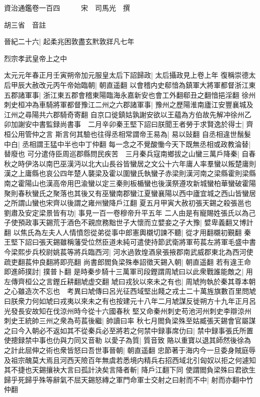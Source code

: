 資治通鑑卷一百四　　　宋　司馬光　撰

胡三省　音註

晉紀二十六|{
	起柔兆困敦盡玄黓敦牂凡七年}


烈宗孝武皇帝上之中

太元元年春正月壬寅朔帝加元服皇太后下詔歸政|{
	太后攝政見上卷上年}
復稱崇德太后甲辰大赦改元丙午帝始臨朝|{
	朝直遥翻}
以會稽内史郗愔為鎮軍大將軍都督浙江東五郡諸軍事|{
	浙江東五郡會稽東陽臨海永嘉新安也會工外翻郗丑之翻愔挹淫翻}
徐州刺史桓冲為車騎將軍都督豫江二州之六郡諸軍事|{
	豫州之歷陽淮南廬江安豐襄城及江州之尋陽共六郡騎奇寄翻}
自京口徙鎮姑孰謝安欲以王藴為方伯故先解冲徐州乙卯加謝安中書監録尚書事　二月辛卯秦王堅下詔曰朕聞王者勞于求賢逸於得士|{
	齊桓公用管仲之言}
斯言何其驗也往得丞相常謂帝王易為|{
	易以䜴翻}
自丞相違世鬚髮中白|{
	丞相謂王猛中半也中丁仲翻}
每一念之不覺酸慟今天下既無丞相或政教淪替|{
	替廢也}
可分遣侍臣周巡郡縣問民疾苦　三月秦兵寇南鄉拔之山蠻三萬戶降秦|{
	自春秋之時伊洛以南巴巫漢沔以北大山長谷皆蠻居之文公十六年庸人率羣蠻以叛楚庸則漢之上庸縣也哀公四年楚人襲梁及霍以圍蠻氏執蠻子赤梁則漢河南之梁縣霍則梁縣南之霍陽山也漢高帝用巴渝蠻以定三秦則板楯蠻也後漢祭遵攻新城蠻柏華蠻破霍陽聚則春秋蠻氏之聚落也其後又有巫蠻南郡蠻江夏蠻襄陽以西中廬宜城之西山皆蠻居之所謂山蠻也宋齊以後謂之雍州蠻降戶江翻}
夏五月甲寅大赦初張天錫之殺張邕也劉肅及安定梁景皆有功|{
	事見一百一卷穆帝升平五年}
二人由是有寵賜姓張氏以為己子使預政事天錫荒于酒色不親庶務黜世子大懷而立嬖妾之子大豫|{
	嬖卑義翻又博計翻}
以焦氏為左夫人人情憤怨從弟從事中郎憲輿櫬切諫不聽|{
	從才用翻櫬初覲翻}
秦王堅下詔曰張天錫雖稱藩受位然臣道未純可遣使持節武衛將軍苟萇左將軍毛盛中書今梁熙步兵校尉姚萇等將兵臨西河|{
	河水過敦煌酒泉張掖郡南武威郡東北為西河使疏吏翻萇仲良翻將即亮翻}
尚書郎閻負梁殊奉詔徵天錫入朝|{
	朝直遥翻}
若有違王命即進師撲討|{
	撲普卜翻}
是時秦步騎十三萬軍司段鏗謂周虓曰以此衆戰誰能敵之|{
	用左傳齊桓公之言鏗丘耕翻虓虚交翻}
虓曰戎狄以來未之有也|{
	周虓拘執於秦其尊本朝之心雖造次不忘也　考異曰虓傳曰呂光征西域堅出餞之戎士二十萬旌旗數百里問虓曰朕衆力何如虓曰戎夷以來未之有也按建元十八年二月虓謀反徙朔方十九年正月呂光發長安故知在伐涼州時今從十六國春秋}
堅又命秦州刺史苟池河州刺史李辯涼州刺史王統帥三州之衆為苟萇後繼|{
	帥讀曰率}
秋七月閻負梁殊至姑臧張天錫會官屬謀之曰今入朝必不返如其不從秦兵必至將若之何禁中録事席仂曰|{
	禁中録事張氏所置使摠録禁中事也仂與力同又音勒}
以愛子為質|{
	質音致}
賂以重寶以退其師然後徐為之計此屈伸之術也衆皆怒曰吾世事晉朝|{
	朝直遥翻}
忠節著于海内今一旦委身賊庭辱及祖宗醜莫大焉且河西天險百年無虞若悉境内精兵右招西域北引匈奴以拒之何遽知其不捷也天錫攘袂大言曰孤計決矣言降者斬|{
	降戶江翻下同}
使謂閻負梁殊曰君欲生歸乎死歸乎殊等辭氣不屈天錫怒縳之軍門命軍士交射之曰射而不中|{
	射而亦翻中竹仲翻}
